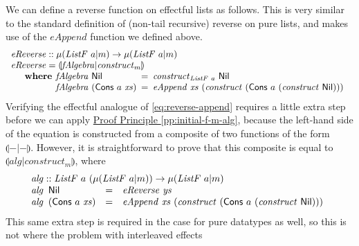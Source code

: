\documentclass{jfp1}
\newcommand{\eFold}[2]{\llparenthesis #1|#2 \rrparenthesis}
\newcommand{\proofprinref}[1]{\hyperref[#1]{Proof Principle \ref*{#1}}}
\newcommand{\kw}[1]{\textbf{#1}}
\begin{document}
We can define a reverse function on effectful lists as follows. This
is very similar to the standard definition of (non-tail recursive)
reverse on pure lists, and makes use of the $\mathit{eAppend}$
function we defined above.
\begin{displaymath}
  \begin{array}{l}
    \mathit{eReverse} :: \mu(\mathit{ListF}~a|m) \to \mu(\mathit{ListF}~a|m) \\
    \mathit{eReverse} = \eFold{\mathit{fAlgebra}}{\mathit{construct}_m} \\
    \quad\begin{array}{r@{\hspace{0.4em}}l@{\hspace{0.5em}}c@{\hspace{0.5em}}l}
      \kw{where} & \mathit{fAlgebra}~\mathsf{Nil} &=& \mathit{construct}_{\mathit{ListF}~a}~\mathsf{Nil} \\
      & \mathit{fAlgebra}~(\mathsf{Cons}~a~\mathit{xs}) &=& \mathit{eAppend}~\mathit{xs}~(\mathit{construct}~(\mathsf{Cons}~a~(\mathit{construct}~\mathsf{Nil})))
    \end{array}
  \end{array}
\end{displaymath}
Verifying the effectful analogue of \autoref{eq:reverse-append} requires a little extra step
before we can apply \proofprinref{pp:initial-f-m-alg}, because the
left-hand side of the equation is constructed from a composite of two
functions of the form $\eFold{-}{-}$. However, it is
straightforward to prove that this composite is equal to
$\eFold{\mathit{alg}}{\mathit{construct}_m}$, where
\begin{displaymath}
  \begin{array}{l}
    \mathit{alg} :: \mathit{ListF}~a~(\mu(\mathit{ListF}~a|m)) \to \mu(\mathit{ListF}~a|m) \\
    \begin{array}{@{}l@{\hspace{0.5em}}lcl}
      \mathit{alg}&\mathsf{Nil} &=& \mathit{eReverse}~\mathit{ys} \\
      \mathit{alg}&(\mathsf{Cons}~a~\mathit{xs}) & =& \mathit{eAppend}~\mathit{xs}~(\mathit{construct}~(\mathsf{Cons}~a~(\mathit{construct}~\mathsf{Nil})))
    \end{array}
  \end{array}
\end{displaymath}
This same extra step is required in the case for pure datatypes as
well, so this is not where the problem with interleaved effects
\end{document}
